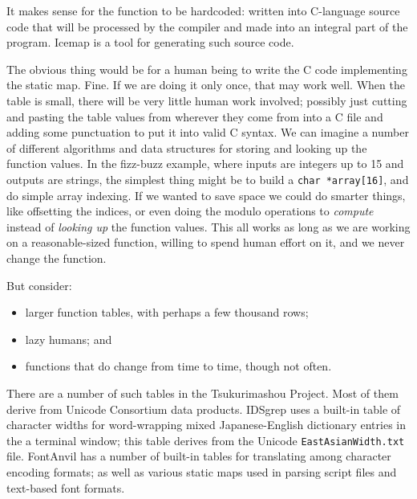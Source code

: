 \documentclass{mitsuba}
\begin{document}
It makes sense for the function to be hardcoded:  written into C-language
source code that will be processed by the compiler and made into an integral
part of the program.  Icemap is a tool for generating such source code.

The obvious thing would be for a human being to write the C code
implementing the static map.  Fine.  If we are doing it only once, that may
work well.  When the table is small, there will be very little human work
involved; possibly just cutting and pasting the table values from wherever
they come from into a C file and adding some punctuation to put it into
valid C syntax.  We can imagine a number of different algorithms and data
structures for storing and looking up the function values.  In the fizz-buzz
example, where inputs are integers up to 15 and outputs are strings, the
simplest thing might be to build a \texttt{char *array[16]}, and do simple
array indexing.  If we wanted to save space we could do smarter things, like
offsetting the indices, or even doing the modulo operations to
\emph{compute} instead of \emph{looking up} the function values.  This
all works as long as we are working on a reasonable-sized function,
willing to spend human effort on it, and we never change the function.

But consider:
\begin{itemize}
  \item larger function tables, with perhaps a few thousand rows;
  \item lazy humans; and
  \item functions that do change from time to time, though not often.
\end{itemize}

There are a number of such tables in the Tsukurimashou Project.  Most of
them derive from Unicode Consortium data products.  IDSgrep uses a built-in
table of character widths for word-wrapping mixed Japanese-English
dictionary entries in the a terminal window; this table derives from the
Unicode \texttt{EastAsianWidth.txt} file.  FontAnvil has a number of
built-in tables for translating among character encoding formats; as well as
various static maps used in parsing script files and text-based font
formats.
\end{document}
